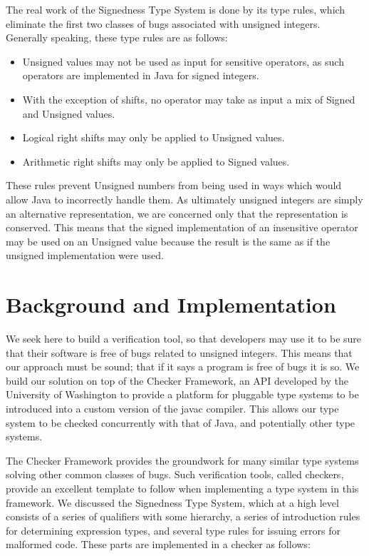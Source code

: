 \documentclass{sig-alternate-05-2015}
\begin{document}
The real work of the Signedness Type System is done by its type rules, which eliminate the first two classes of bugs associated with unsigned integers. Generally speaking, these type rules are as follows:

\begin{itemize}\itemsep 0pt \parskip 0pt
  \item Unsigned values may not be used as input for sensitive operators, as such operators are implemented in Java for signed integers.
  \item With the exception of shifts, no operator may take as input a mix of Signed and Unsigned values.
  \item Logical right shifts may only be applied to Unsigned values.
  \item Arithmetic right shifts may only be applied to Signed values.
\end{itemize}

These rules prevent Unsigned numbers from being used in ways which would allow Java to incorrectly handle them. As ultimately unsigned integers are simply an alternative representation, we are concerned only that the representation is conserved. This means that the signed implementation of an insensitive operator may be used on an Unsigned value because the result is the same as if the unsigned implementation were used.

\section{Background and Implementation}


We seek here to build a verification tool, so that developers may use it to be sure that their software is free of bugs related to unsigned integers. This means that our approach must be sound; that if it says a program is free of bugs it is so. We build our solution on top of the Checker Framework, an API developed by the University of Washington to provide a platform for pluggable type systems to be introduced into a custom version of the javac compiler. This allows our type system to be checked concurrently with that of Java, and potentially other type systems.

The Checker Framework provides the groundwork for many similar type systems solving other common classes of bugs. Such verification tools, called checkers, provide an excellent template to follow when implementing a type system in this framework. We discussed the Signedness Type System, which at a high level consists of a series of qualifiers with some hierarchy, a series of introduction rules for determining expression types, and several type rules for issuing errors for malformed code. These parts are implemented in a checker as follows:
\end{document}
